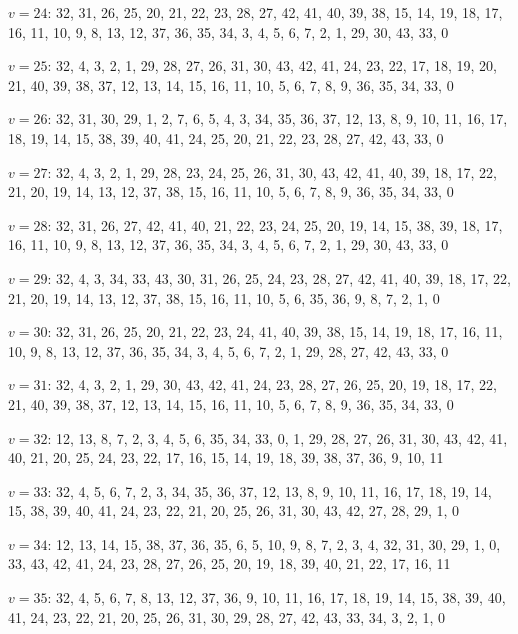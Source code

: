 \documentclass{amcjoucc}
\begin{document}
\begin{itemize}
{\item $v = 24$: 32, 31, 26, 25, 20, 21, 22, 23, 28, 27, 42, 41, 40, 39, 38, 15, 14, 19, 18, 17, 16, 11, 10, 9, 8, 13, 12, 37, 36, 35, 34, 3, 4, 5, 6, 7, 2, 1, 29, 30, 43, 33, 0
\item $v = 25$: 32, 4, 3, 2, 1, 29, 28, 27, 26, 31, 30, 43, 42, 41, 24, 23, 22, 17, 18, 19, 20, 21, 40, 39, 38, 37, 12, 13, 14, 15, 16, 11, 10, 5, 6, 7, 8, 9, 36, 35, 34, 33, 0
\item $v = 26$: 32, 31, 30, 29, 1, 2, 7, 6, 5, 4, 3, 34, 35, 36, 37, 12, 13, 8, 9, 10, 11, 16, 17, 18, 19, 14, 15, 38, 39, 40, 41, 24, 25, 20, 21, 22, 23, 28, 27, 42, 43, 33, 0
\item $v = 27$: 32, 4, 3, 2, 1, 29, 28, 23, 24, 25, 26, 31, 30, 43, 42, 41, 40, 39, 18, 17, 22, 21, 20, 19, 14, 13, 12, 37, 38, 15, 16, 11, 10, 5, 6, 7, 8, 9, 36, 35, 34, 33, 0
\item $v = 28$: 32, 31, 26, 27, 42, 41, 40, 21, 22, 23, 24, 25, 20, 19, 14, 15, 38, 39, 18, 17, 16, 11, 10, 9, 8, 13, 12, 37, 36, 35, 34, 3, 4, 5, 6, 7, 2, 1, 29, 30, 43, 33, 0
\item $v = 29$: 32, 4, 3, 34, 33, 43, 30, 31, 26, 25, 24, 23, 28, 27, 42, 41, 40, 39, 18, 17, 22, 21, 20, 19, 14, 13, 12, 37, 38, 15, 16, 11, 10, 5, 6, 35, 36, 9, 8, 7, 2, 1, 0
\item $v = 30$: 32, 31, 26, 25, 20, 21, 22, 23, 24, 41, 40, 39, 38, 15, 14, 19, 18, 17, 16, 11, 10, 9, 8, 13, 12, 37, 36, 35, 34, 3, 4, 5, 6, 7, 2, 1, 29, 28, 27, 42, 43, 33, 0
\item $v = 31$: 32, 4, 3, 2, 1, 29, 30, 43, 42, 41, 24, 23, 28, 27, 26, 25, 20, 19, 18, 17, 22, 21, 40, 39, 38, 37, 12, 13, 14, 15, 16, 11, 10, 5, 6, 7, 8, 9, 36, 35, 34, 33, 0
\item $v = 32$: 12, 13, 8, 7, 2, 3, 4, 5, 6, 35, 34, 33, 0, 1, 29, 28, 27, 26, 31, 30, 43, 42, 41, 40, 21, 20, 25, 24, 23, 22, 17, 16, 15, 14, 19, 18, 39, 38, 37, 36, 9, 10, 11
\item $v = 33$: 32, 4, 5, 6, 7, 2, 3, 34, 35, 36, 37, 12, 13, 8, 9, 10, 11, 16, 17, 18, 19, 14, 15, 38, 39, 40, 41, 24, 23, 22, 21, 20, 25, 26, 31, 30, 43, 42, 27, 28, 29, 1, 0
\item $v = 34$: 12, 13, 14, 15, 38, 37, 36, 35, 6, 5, 10, 9, 8, 7, 2, 3, 4, 32, 31, 30, 29, 1, 0, 33, 43, 42, 41, 24, 23, 28, 27, 26, 25, 20, 19, 18, 39, 40, 21, 22, 17, 16, 11
\item $v = 35$: 32, 4, 5, 6, 7, 8, 13, 12, 37, 36, 9, 10, 11, 16, 17, 18, 19, 14, 15, 38, 39, 40, 41, 24, 23, 22, 21, 20, 25, 26, 31, 30, 29, 28, 27, 42, 43, 33, 34, 3, 2, 1, 0
}
\end{itemize}
\end{document}
